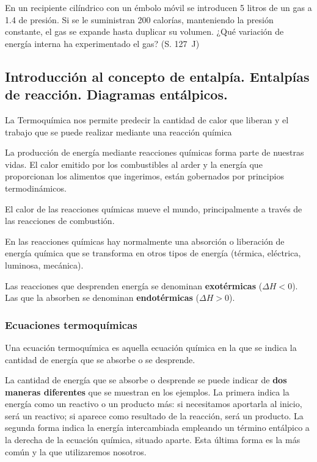 \documentclass[
  spanish,
]{article}
\begin{document}
\begin{exercise}En un recipiente cilíndrico con un émbolo móvil se
introducen 5 litros de un gas a \qty{1,4}{\atm} de presión. Si se le
suministran 200 calorías, manteniendo la presión constante, el gas se
expande hasta duplicar su volumen. ¿Qué variación de energía interna ha
experimentado el gas? (S. \qty{127}{\J})\end{exercise}

\hypertarget{introducciuxf3n-al-concepto-de-entalpuxeda.-entalpuxedas-de-reacciuxf3n.-diagramas-entuxe1lpicos.}{%
\subsection{Introducción al concepto de entalpía. Entalpías de reacción.
Diagramas
entálpicos.}\label{introducciuxf3n-al-concepto-de-entalpuxeda.-entalpuxedas-de-reacciuxf3n.-diagramas-entuxe1lpicos.}}

La Termoquímica nos permite predecir la cantidad de calor que liberan y
el trabajo que se puede realizar mediante una reacción química

La producción de energía mediante reacciones químicas forma parte de
nuestras vidas. El calor emitido por los combustibles al arder y la
energía que proporcionan los alimentos que ingerimos, están gobernados
por principios termodinámicos.

El calor de las reacciones químicas mueve el mundo, principalmente a
través de las reacciones de combustión.

En las reacciones químicas hay normalmente una absorción o liberación de
energía química que se transforma en otros tipos de energía (térmica,
eléctrica, luminosa, mecánica).

Las reacciones que desprenden energía se denominan \textbf{exotérmicas}
(\(\Delta H < 0\)). Las que la absorben se denominan
\textbf{endotérmicas} (\(\Delta H > 0\)).

\hypertarget{ecuaciones-termoquuxedmicas}{%
\subsubsection{Ecuaciones
termoquímicas}\label{ecuaciones-termoquuxedmicas}}

Una ecuación termoquímica es aquella ecuación química en la que se
indica la cantidad de energía que se absorbe o se desprende.

La cantidad de energía que se absorbe o desprende se puede indicar de
\textbf{dos maneras diferentes} que se muestran en los ejemplos. La
primera indica la energía como un reactivo o un producto más: si
necesitamos aportarla al inicio, será un reactivo; si aparece como
resultado de la reacción, será un producto. La segunda forma indica la
energía intercambiada empleando un término entálpico a la derecha de la
ecuación química, situado aparte. Esta última forma es la más común y la
que utilizaremos nosotros.
\end{document}
